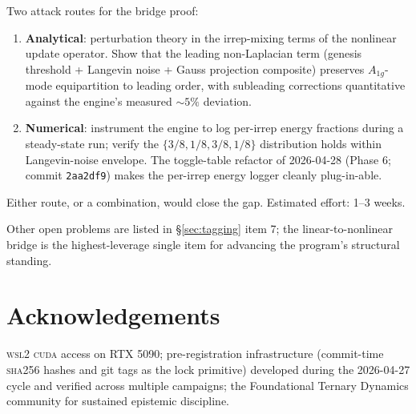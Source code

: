 \documentclass[11pt,reqno]{amsart}
\theoremstyle{plain}
\theoremstyle{definition}
\theoremstyle{remark}
\numberwithin{equation}{section}
\newcommand{\Aoneg}{A_{1g}}
\begin{document}
Two attack routes for the bridge proof:

\begin{enumerate}
\item \textbf{Analytical}: perturbation theory in the irrep-mixing
terms of the nonlinear update operator. Show that the leading
non-Laplacian term (genesis threshold + Langevin noise + Gauss
projection composite) preserves $\Aoneg$-mode equipartition to
leading order, with subleading corrections quantitative against
the engine's measured $\sim5\%$ deviation.
\item \textbf{Numerical}: instrument the engine to log per-irrep
energy fractions during a steady-state run; verify the
$\{3/8, 1/8, 3/8, 1/8\}$ distribution holds within Langevin-noise
envelope. The toggle-table refactor of 2026-04-28 (Phase 6;
commit \texttt{2aa2df9}) makes the per-irrep energy logger cleanly
plug-in-able.
\end{enumerate}

Either route, or a combination, would close the gap. Estimated
effort: 1--3 weeks.

Other open problems are listed in \S\ref{sec:tagging} item 7;
the linear-to-nonlinear bridge is the highest-leverage single
item for advancing the program's structural standing.

\section*{Acknowledgements}

\textsc{wsl2} \textsc{cuda} access on RTX 5090; pre-registration
infrastructure (commit-time \textsc{sha256} hashes and git tags as
the lock primitive) developed during the 2026-04-27 cycle and
verified across multiple campaigns; the Foundational Ternary
Dynamics community for sustained epistemic discipline.


\end{document}
